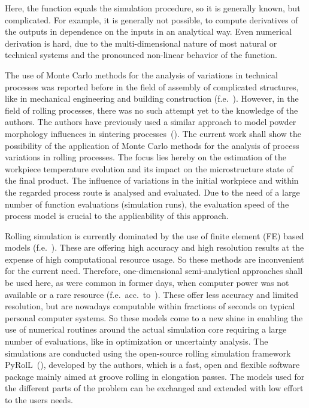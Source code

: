 Here, the function equals the simulation procedure, so it is generally known, but complicated.
For example, it is generally not possible, to compute derivatives of the outputs in dependence on the inputs in an analytical way.
Even numerical derivation is hard, due to the multi-dimensional nature of most natural or technical systems and the pronounced non-linear behavior of the function.

The use of Monte Carlo methods for the analysis of variations in technical processes was reported before in the field of assembly of complicated structures, like in mechanical engineering and building construction (f.e.~\cite{Lin1997, Shen2005, Dantan2009, Qureshi2012, Yan2015, Rausch2019}).
However, in the field of rolling processes, there was no such attempt yet to the knowledge of the authors.
The authors have previously used a similar approach to model powder morphology influences in sintering processes~(\cite{Weiner2022a, Weiner2022b}).
The current work shall show the possibility of the application of Monte Carlo methods for the analysis of process variations in rolling processes.
The focus lies hereby on the estimation of the workpiece temperature evolution and its impact on the microstructure state of the final product.
The influence of variations in the initial workpiece and within the regarded process route is analysed and evaluated.
Due to the need of a large number of function evaluations (simulation runs), the evaluation speed of the process model is crucial to the applicability of this approach.

Rolling simulation is currently dominated by the use of finite element (FE) based models (f.e.~\cite{Kim2005, Liu2002, Takashima2014}).
These are offering high accuracy and high resolution results at the expense of high computational resource usage.
So these methods are inconvenient for the current need.
Therefore, one-dimensional semi-analytical approaches shall be used here, as were common in former days, when computer power was not available or a rare resource (f.e.~acc.~to~\textcite{Hensel1978, Wusatowski1969, Lendl1948, Sims1954}).
These offer less accuracy and limited resolution, but are nowadays computable within fractions of seconds on typical personal computer systems.
So these models come to a new shine in enabling the use of numerical routines around the actual simulation core requiring a large number of evaluations, like in optimization or uncertainty analysis.
The simulations are conducted using the open-source rolling simulation framework PyRolL~(\cite{pyroll_jors}), developed by the authors, which is a fast, open and flexible software package mainly aimed at groove rolling in elongation passes.
The models used for the different parts of the problem can be exchanged and extended with low effort to the users needs.
